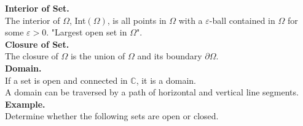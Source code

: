 \documentclass[11pt]{article}
\begin{document}
\newline
\textbf{Interior of Set.} \\
The interior of $\Omega$, Int$(\Omega)$, is all points in $\Omega$ with a $\varepsilon$-ball contained in $\Omega$ for some $\varepsilon > 0$. "Largest open set in $\Omega$". \\
\newline
\textbf{Closure of Set.} \\ 
The closure of $\Omega$ is the union of $\Omega$ and its boundary $\partial \Omega$. \\
\newline
\textbf{Domain.} \\
If a set is open and connected in $\mathbb{C}$, it is a domain. \\
A domain can be traversed by a path of horizontal and vertical line segments. \\
\newline
\textbf{Example.}\\
Determine whether the following sets are open or closed. 
\end{document}
